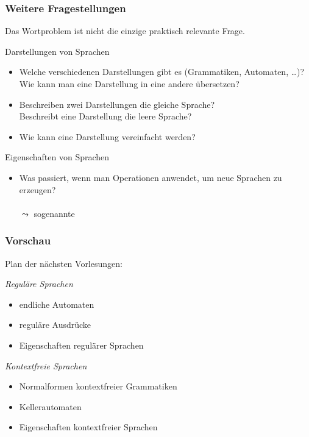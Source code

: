 \documentclass[aspectratio=1610,onlymath]{beamer}
\begin{document}
\begin{frame}\frametitle{Weitere Fragestellungen}

Das Wortproblem ist nicht die einzige praktisch relevante Frage.
\medskip

\alert{Darstellungen von Sprachen}
\begin{itemize}
\item Welche verschiedenen Darstellungen gibt es (Grammatiken, Automaten, \ldots)?\\ Wie kann man eine Darstellung in eine andere übersetzen?
\item Beschreiben zwei Darstellungen die gleiche Sprache?\\ Beschreibt eine Darstellung die leere Sprache?
\item Wie kann eine Darstellung vereinfacht werden?
\end{itemize}

\alert{Eigenschaften von Sprachen}
\begin{itemize}
\item Was passiert, wenn man Operationen anwendet, um neue Sprachen zu erzeugen?\\[1ex]
\\[0.5ex]
$\leadsto$ sogenannte 
\end{itemize}

\end{frame}

\begin{frame}\frametitle{Vorschau}

Plan der nächsten Vorlesungen:
\medskip

\emph{Reguläre Sprachen}
\begin{itemize}
\item endliche Automaten
\item reguläre Ausdrücke
\item Eigenschaften regulärer Sprachen
\end{itemize}

\emph{Kontextfreie Sprachen}
\begin{itemize}
\item Normalformen kontextfreier Grammatiken
\item Kellerautomaten
\item Eigenschaften kontextfreier Sprachen
\end{itemize}

\end{frame}
\end{document}
